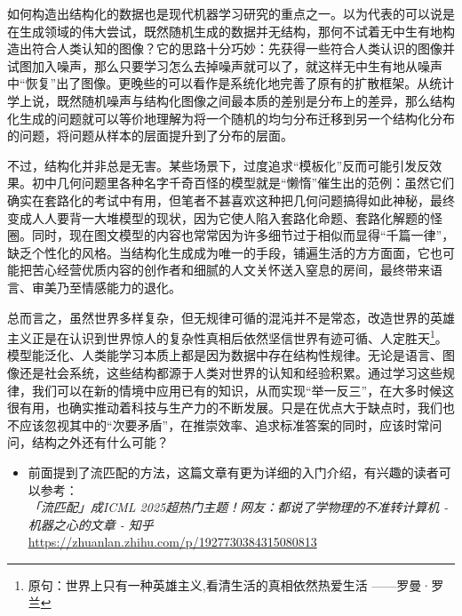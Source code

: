 如何构造出结构化的数据也是现代机器学习研究的重点之一。以为代表的可以说是在生成领域的伟大尝试，既然随机生成的数据并无结构，那何不试着无中生有地构造出符合人类认知的图像？它的思路十分巧妙：先获得一些符合人类认识的图像并试图加入噪声，那么只要学习怎么去掉噪声就可以了，就这样无中生有地从噪声中“恢复”出了图像。更晚些的可以看作是系统化地完善了原有的扩散框架。从统计学上说，既然随机噪声与结构化图像之间最本质的差别是分布上的差异，那么结构化生成的问题就可以等价地理解为将一个随机的均匀分布迁移到另一个结构化分布的问题，将问题从样本的层面提升到了分布的层面。

不过，结构化并非总是无害。某些场景下，过度追求“模板化”反而可能引发反效果。初中几何问题里各种名字千奇百怪的模型就是“懒惰”催生出的范例：虽然它们确实在套路化的考试中有用，但笔者不甚喜欢这种把几何问题搞得如此神秘，最终变成人人要背一大堆模型的现状，因为它使人陷入套路化命题、套路化解题的怪圈。同时，现在图文模型的内容也常常因为许多细节过于相似而显得“千篇一律”，缺乏个性化的风格。当结构化生成成为唯一的手段，铺遍生活的方方面面，它也可能把苦心经营优质内容的创作者和细腻的人文关怀送入窒息的房间，最终带来语言、审美乃至情感能力的退化。

总而言之，虽然世界多样复杂，但无规律可循的混沌并不是常态，改造世界的英雄主义正是在认识到世界惊人的复杂性真相后依然坚信世界有迹可循、人定胜天\footnote{原句：世界上只有一种英雄主义,看清生活的真相依然热爱生活 ——罗曼·罗兰}。模型能泛化、人类能学习本质上都是因为数据中存在结构性规律。无论是语言、图像还是社会系统，这些结构都源于人类对世界的认知和经验积累。通过学习这些规律，我们可以在新的情境中应用已有的知识，从而实现“举一反三”，在大多时候这很有用，也确实推动着科技与生产力的不断发展。只是在优点大于缺点时，我们也不应该忽视其中的“次要矛盾”，在推崇效率、追求标准答案的同时，应该时常问问，结构之外还有什么可能？

\begin{tcolorbox}[myrecommendbox, title=推荐阅读, breakable=false]
    \begin{itemize}
        \item 前面提到了流匹配的方法，这篇文章有更为详细的入门介绍，有兴趣的读者可以参考：\\
              \textit{「流匹配」成ICML 2025超热门主题！网友：都说了学物理的不准转计算机 - 机器之心的文章 - 知乎}\\
              \url{https://zhuanlan.zhihu.com/p/1927730384315080813}
    \end{itemize}
\end{tcolorbox}

